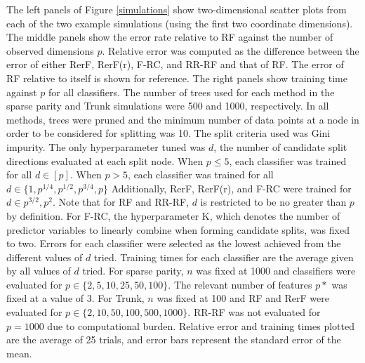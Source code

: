 The left panels of Figure \ref{simulations} show two-dimensional scatter plots from each of the two example simulations (using the first two coordinate dimensions). The middle panels show the error rate relative to RF against the number of observed dimensions $p$. Relative error was computed as the difference between the error of either RerF, RerF(r), F-RC, and RR-RF and that of RF. The error of RF relative to itself is shown for reference. The right panels show training time against $p$ for all classifiers. The number of trees used for each method in the sparse parity and Trunk simulations were 500 and 1000, respectively. In all methods, trees were pruned and the minimum number of data points at a node in order to be considered for splitting was 10. The split criteria used was Gini impurity. The only hyperparameter tuned was $d$, the number of candidate split directions evaluated at each split node. When $p \leq 5$, each classifier was trained for all $d \in [p]$. When $p > 5$, each classifier was trained for all $d \in \{1,p^{1/4},p^{1/2},p^{3/4},p\}$ Additionally, RerF, RerF(r), and F-RC were trained for $d \in {p^{3/2},p^2}$. Note that for RF and RR-RF, $d$ is restricted to be no greater than $p$ by definition. For F-RC, the hyperparameter K, which denotes the number of predictor variables to linearly combine when forming candidate splits, was fixed to two. Errors for each classifier were selected as the lowest achieved from the different values of $d$ tried. Training times for each classifier are the average given by all values of $d$ tried. For sparse parity, $n$ was fixed at 1000 and classifiers were evaluated for $p \in \{2,5,10,25,50,100\}$. The relevant number of features $p*$ was fixed at a value of 3. For Trunk, $n$ was fixed at 100 and RF and RerF were evaluated for $p \in \{2,10,50,100,500,1000\}$. RR-RF was not evaluated for $p = 1000$ due to computational burden. Relative error and training times plotted are the average of 25 trials, and error bars represent the standard error of the mean.

